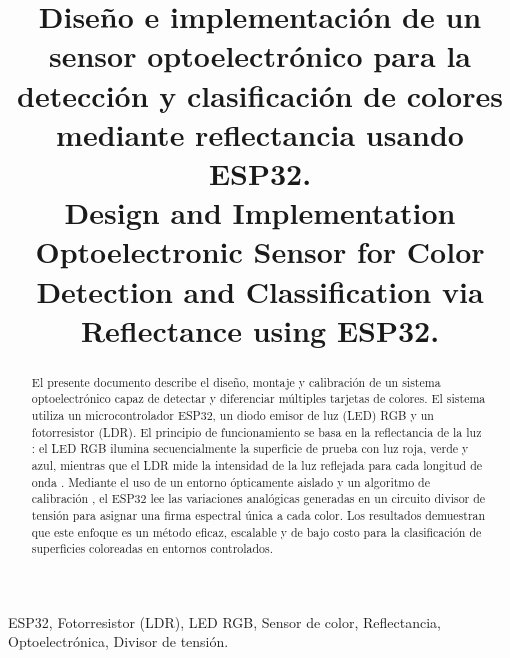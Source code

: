 \documentclass[conference]{IEEEtran}
\begin{document}
\title{Diseño e implementación de un sensor optoelectrónico para la detección y clasificación de colores mediante reflectancia usando ESP32.\\ {\huge Design and Implementation Optoelectronic Sensor for Color Detection and Classification via Reflectance using ESP32.}}

\author{
}
\IEEEaftertitletext{\vspace{-1\baselineskip}}
\maketitle

\renewcommand\abstractname{Resumen}
\begin{abstract}
El presente documento describe el diseño, montaje y calibración de un sistema optoelectrónico capaz de detectar y diferenciar múltiples tarjetas de colores. El sistema utiliza un microcontrolador ESP32, un diodo emisor de luz (LED) RGB y un fotorresistor (LDR). El principio de funcionamiento se basa en la reflectancia de la luz \cite{ldr_2}: el LED RGB ilumina secuencialmente la superficie de prueba con luz roja, verde y azul, mientras que el LDR mide la intensidad de la luz reflejada para cada longitud de onda \cite{ldr_3}. Mediante el uso de un entorno ópticamente aislado y un algoritmo de calibración \cite{ldr_4}, el ESP32 lee las variaciones analógicas generadas en un circuito divisor de tensión para asignar una firma espectral única a cada color. Los resultados demuestran que este enfoque es un método eficaz, escalable y de bajo costo para la clasificación de superficies coloreadas en entornos controlados.
\end{abstract}

\renewcommand\IEEEkeywordsname{Palabras clave}
\begin{keywords}
ESP32, Fotorresistor (LDR), LED RGB, Sensor de color, Reflectancia, Optoelectrónica, Divisor de tensión.
\end{keywords}
\end{document}
